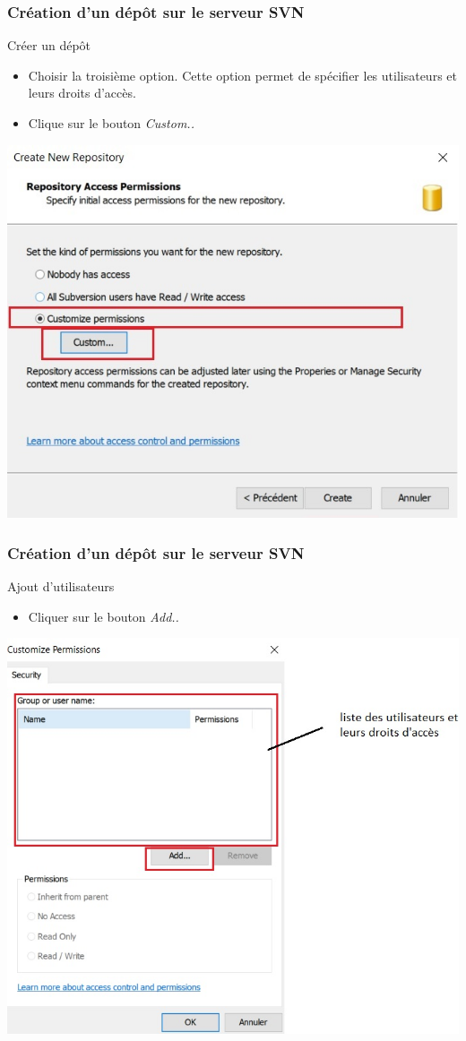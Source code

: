 \documentclass{beamer}
\begin{document}
\begin{frame}
\frametitle{Création d'un dépôt sur le serveur SVN}
\begin{block}{Créer un dépôt}
\begin{itemize}
\item Choisir la troisième option. Cette option permet de spécifier les utilisateurs et leurs droits d'accès.
\item Clique sur le bouton \alert{\textit{Custom..}}
\end{itemize}
\end{block}
\includegraphics[scale=.5]{../images/server9.jpg}
\end{frame}

\begin{frame}
\frametitle{Création d'un dépôt sur le serveur SVN}
\begin{block}{Ajout d'utilisateurs}
\begin{itemize}
\item Cliquer sur le bouton \alert{\textit{Add..}}
\end{itemize}
\end{block}
\includegraphics[scale=.5]{../images/server10.jpg}
\end{frame}
\end{document}
